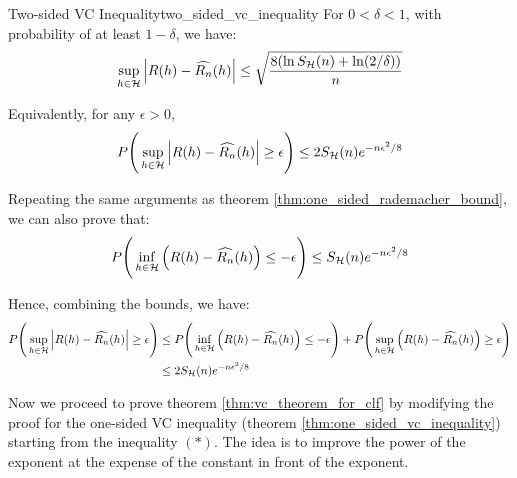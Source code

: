 \begin{theorem}{Two-sided VC Inequality}{two_sided_vc_inequality}
    For $0<\delta<1$, with probability of at least $1-\delta$, we have:
    \begin{align*}
        \sup_{h\in\mathcal{H}} \Big| 
            R(h) - \widehat{R_n}(h)
         \Big| \le \sqrt{
            \frac{8(\ln S_{\mathcal{H}}(n) + \ln(2/\delta))}{n}
        }
    \end{align*}

    \noindent Equivalently, for any $\epsilon>0$, 
    \begin{align*}
        P\Bigg( 
            \sup_{h\in\mathcal{H}} \Big| 
                R(h) - \widehat{R_n}(h)
             \Big|\ge \epsilon
         \Bigg)\le 2S_{\mathcal{H}}(n)e^{-n\epsilon^2/8}
    \end{align*}
\end{theorem}

\begin{proof*}
    Repeating the same arguments as theorem \ref{thm:one_sided_rademacher_bound}, we can also prove that:
    \begin{align*}
        P\Bigg( 
            \inf_{h\in\mathcal{H}} \Big( 
                R(h) - \widehat{R_n}(h)
             \Big) \le -\epsilon 
         \Bigg) \le S_{\mathcal{H}}(n)e^{-n\epsilon^2/8}
    \end{align*}

    \noindent Hence, combining the bounds, we have:
    \begin{align*}
        P\Bigg( 
            \sup_{h\in\mathcal{H}} \Big| 
                R(h) - \widehat{R_n}(h)
             \Big| \ge \epsilon 
         \Bigg) 
        &\le P\Bigg( 
            \inf_{h\in\mathcal{H}} \Big( 
                R(h) - \widehat{R_n}(h)
             \Big) \le -\epsilon 
         \Bigg) + P\Bigg( 
            \sup_{h\in\mathcal{H}} \Big( 
                R(h) - \widehat{R_n}(h)
             \Big) \ge \epsilon 
         \Bigg) \\
        &\le 2S_{\mathcal{H}}(n)e^{-n\epsilon^2/8}
    \end{align*}
\end{proof*}

\noindent Now we proceed to prove theorem \ref{thm:vc_theorem_for_clf} by modifying the proof for the one-sided VC inequality (theorem \ref{thm:one_sided_vc_inequality}) starting from the inequality $(*)$. The idea is to improve the power of the exponent at the expense of the constant in front of the exponent.

